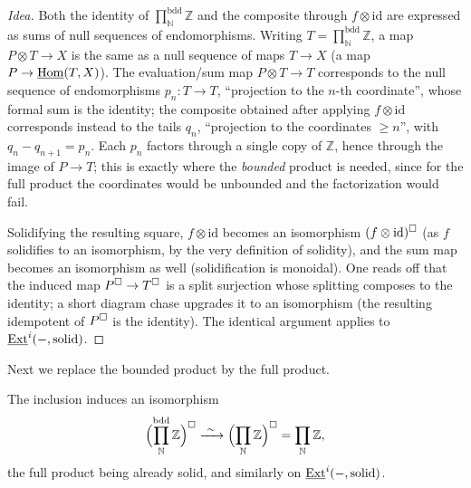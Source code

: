 \begin{proof}[Idea]
Both the identity of $\prod_{\mathbb{N}}^{\mathrm{bdd}}\mathbb{Z}$ and the
composite through $f\otimes\mathrm{id}$ are expressed as sums of null sequences of
endomorphisms. Writing $T=\prod_{\mathbb{N}}^{\mathrm{bdd}}\mathbb{Z}$, a map
$P\otimes T\to X$ is the same as a null sequence of maps $T\to X$ (a map
$P\to\underline{\operatorname{Hom}}(T,X)$). The evaluation/sum map $P\otimes T\to T$ corresponds to the
null sequence of endomorphisms $p_n\colon T\to T$, ``projection to the $n$-th
coordinate'', whose formal sum is the identity; the composite obtained after
applying $f\otimes\mathrm{id}$ corresponds instead to the tails $q_n$,
``projection to the coordinates $\ge n$'', with $q_n-q_{n+1}=p_n$. Each $p_n$
factors through a single copy of $\mathbb{Z}$, hence through the image of
$P\to T$; this is exactly where the \emph{bounded} product is needed, since for
the full product the coordinates would be unbounded and the factorization would
fail.

Solidifying the resulting square, $f\otimes\mathrm{id}$ becomes an isomorphism
$(f\otimes\mathrm{id})^{\square}$ (as $f$ solidifies to an isomorphism, by the very
definition of solidity), and the sum map becomes an isomorphism as well
(solidification is monoidal). One reads off that the induced map
$P^{\square}\to T^{\square}$ is a split surjection whose splitting composes to the
identity; a short diagram chase upgrades it to an isomorphism (the resulting
idempotent of $P^{\square}$ is the identity). The identical argument applies to
$\underline{\operatorname{Ext}}^{i}(-,\text{solid})$.
\end{proof}

Next we replace the bounded product by the full product.

\begin{lemma}
\label{lem:5:bounded-to-full}
The inclusion induces an isomorphism
\begin{equation}
\label{eq:5:bounded-full}
\Bigl(\prod_{\mathbb{N}}^{\mathrm{bdd}}\mathbb{Z}\Bigr)^{\square}
\xrightarrow{\ \sim\ }\Bigl(\prod_{\mathbb{N}}\mathbb{Z}\Bigr)^{\square}
=\prod_{\mathbb{N}}\mathbb{Z},
\end{equation}
the full product being already solid, and similarly on $\underline{\operatorname{Ext}}^{i}(-,\text{solid})$.
\end{lemma}

